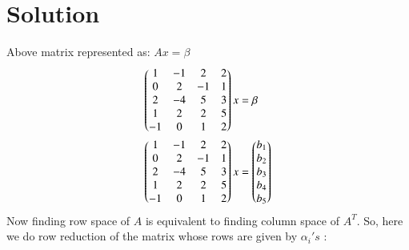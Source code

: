\documentclass[journal,12pt,twocolumn]{IEEEtran}
\begin{document}
\section{\textbf{Solution}}
Above matrix represented as: $Ax = \beta$
\begin{align}
    \begin{pmatrix}1 & -1 & 2 & 2 \\
                    0 & 2 & -1 & 1 \\
                    2 & -4 & 5 & 3 \\
                    1 & 2 & 2 & 5 \\
                    -1 & 0 & 1 & 2\end{pmatrix}x &= \beta\\
    \begin{pmatrix}1 & -1 & 2 & 2 \\
                    0 & 2 & -1 & 1 \\
                    2 & -4 & 5 & 3 \\
                    1 & 2 & 2 & 5 \\
                    -1 & 0 & 1 & 2\end{pmatrix}x &= 
                    \begin{pmatrix}b_1 \\ b_2 \\ b_3\\ b_4 \\ b_5\end{pmatrix}
\end{align}
Now finding row space of $A$ is equivalent to finding column space of $A^T$. So, here we do row reduction of the matrix whose rows are given by $\alpha_i's$ :
\end{document}
